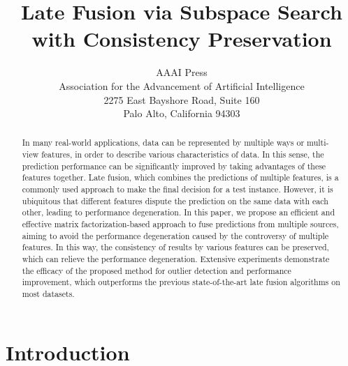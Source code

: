 \documentclass[letterpaper]{article} %
\begin{document}
%
\title{Late Fusion via Subspace Search with Consistency Preservation}
\author{AAAI Press\\
Association for the Advancement of Artificial Intelligence\\
2275 East Bayshore Road, Suite 160\\
Palo Alto, California 94303\\
}
\maketitle
\begin{abstract}
In many real-world applications, data can be represented by multiple ways or multi-view features, in order to describe various characteristics of data. In this sense, the prediction performance can be significantly improved by taking advantages of these features together. Late fusion, which combines the predictions of multiple features, is a commonly used approach to make the final decision for a test instance. However, it is ubiquitous that different features dispute the prediction on the same data with each other, leading to performance degeneration. In this paper, we propose an efficient and effective matrix factorization-based approach to fuse predictions from multiple sources, aiming to avoid the performance degeneration caused by the controversy of multiple features. In this way, the consistency of results by various features can be preserved, which can relieve the performance degeneration. Extensive experiments demonstrate the efficacy of the proposed method for outlier detection and performance improvement, which outperforms the previous state-of-the-art late fusion algorithms on most datasets.
\end{abstract}



\section{Introduction}
\end{document}
